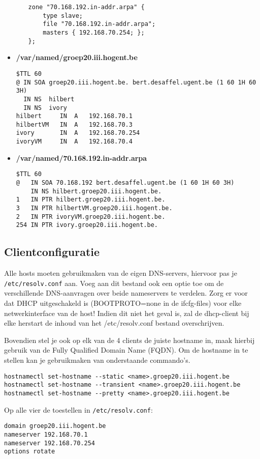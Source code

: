 \documentclass{report}
\begin{document}
\begin{itemize}
\begin{itemize}
\begin{lstlisting}
zone "70.168.192.in-addr.arpa" {
	type slave;
	file "70.168.192.in-addr.arpa";
	masters { 192.168.70.254; };
};
		\end{lstlisting}
	\end{itemize}
	\item \textbf{/var/named/groep20.iii.hogent.be}
	\begin{lstlisting}
$TTL 60
@ IN SOA groep20.iii.hogent.be. bert.desaffel.ugent.be (1 60 1H 60 3H)
  IN NS	 hilbert
  IN NS  ivory
hilbert 	IN	A	192.168.70.1
hilbertVM 	IN	A	192.168.70.3
ivory 		IN	A	192.168.70.254
ivoryVM	 	IN	A	192.168.70.4
	\end{lstlisting}
	\item \textbf{/var/named/70.168.192.in-addr.arpa}
	\begin{lstlisting}
$TTL 60
@   IN SOA 70.168.192 bert.desaffel.ugent.be (1 60 1H 60 3H)
    IN NS hilbert.groep20.iii.hogent.be.	
1   IN PTR hilbert.groep20.iii.hogent.be.
3   IN PTR hilbertVM.groep20.iii.hogent.be.
2   IN PTR ivoryVM.groep20.iii.hogent.be.
254 IN PTR ivory.groep20.iii.hogent.be.
	\end{lstlisting}	
\end{itemize}

\subsection{Clientconfiguratie}
Alle hosts moeten gebruikmaken van de eigen DNS-servers, hiervoor pas je \texttt{/etc/resolv.conf} aan. Voeg aan dit bestand ook een optie toe om de verschillende DNS-aanvragen over beide nameservers te verdelen.
Zorg er voor dat DHCP uitgeschakeld is (BOOTPROTO=none in de ifcfg-files) voor elke netwerkinterface van de host! Indien dit niet het geval is, zal de dhcp-client bij elke herstart de inhoud van het /etc/resolv.conf bestand overschrijven.

Bovendien stel je ook op elk van de 4 clients de juiste hostname in, maak hierbij gebruik van de Fully Qualified Domain Name (FQDN). Om de hostname in te stellen kan je gebruikmaken van onderstaande commando's. 
\begin{lstlisting}
hostnamectl set-hostname --static <name>.groep20.iii.hogent.be
hostnamectl set-hostname --transient <name>.groep20.iii.hogent.be
hostnamectl set-hostname --pretty <name>.groep20.iii.hogent.be
\end{lstlisting}
Op alle vier de toestellen in \texttt{/etc/resolv.conf}:
\begin{lstlisting}
domain groep20.iii.hogent.be
nameserver 192.168.70.1
nameserver 192.168.70.254
options rotate
\end{lstlisting}
\end{document}
